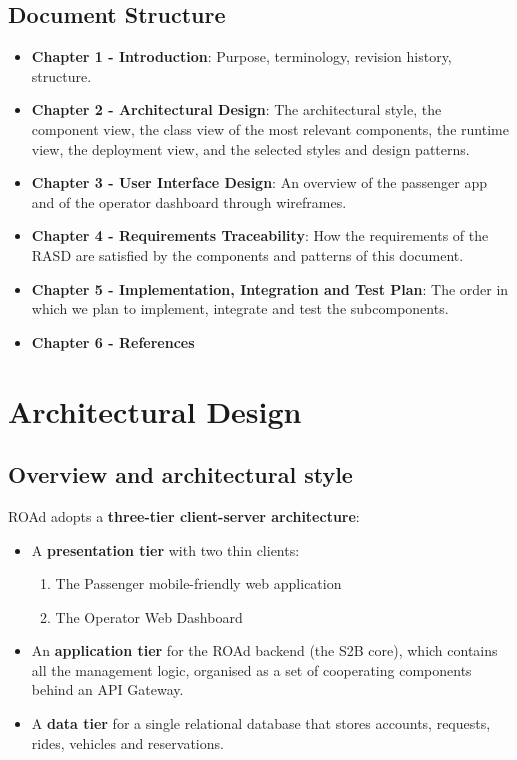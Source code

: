 \documentclass[11pt,a4paper,oneside]{report}
\providecommand{\tightlist}{\setlength{\itemsep}{0pt}\setlength{\parskip}{0pt}}
\begin{document}
\hypertarget{document-structure}{%
\section{Document Structure}\label{document-structure}}

\begin{itemize}
\tightlist
\item
  \textbf{Chapter 1 - Introduction}: Purpose, terminology, revision
  history, structure.
\item
  \textbf{Chapter 2 - Architectural Design}: The architectural style,
  the component view, the class view of the most relevant components,
  the runtime view, the deployment view, and the selected styles and
  design patterns.
\item
  \textbf{Chapter 3 - User Interface Design}: An overview of the
  passenger app and of the operator dashboard through wireframes.
\item
  \textbf{Chapter 4 - Requirements Traceability}: How the requirements
  of the RASD are satisfied by the components and patterns of this
  document.
\item
  \textbf{Chapter 5 - Implementation, Integration and Test Plan}: The
  order in which we plan to implement, integrate and test the
  subcomponents.
\item
  \textbf{Chapter 6 - References}
\end{itemize}

\hypertarget{architectural-design}{%
\chapter{Architectural Design}\label{architectural-design}}

\hypertarget{overview-and-architectural-style}{%
\section{Overview and architectural
style}\label{overview-and-architectural-style}}

ROAd adopts a \textbf{three-tier client-server architecture}:

\begin{itemize}
\tightlist
\item
  A \textbf{presentation tier} with two thin clients:

  \begin{enumerate}
  \def\labelenumi{\arabic{enumi}.}
  \tightlist
  \item
    The Passenger mobile-friendly web application
  \item
    The Operator Web Dashboard
  \end{enumerate}
\item
  An \textbf{application tier} for the ROAd backend (the S2B core),
  which contains all the management logic, organised as a set of
  cooperating components behind an API Gateway.
\item
  A \textbf{data tier} for a single relational database that stores
  accounts, requests, rides, vehicles and reservations.
\end{itemize}
\end{document}
